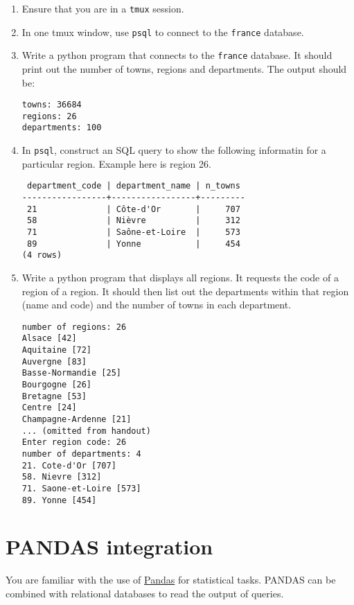 \documentclass{pgnotes}
\begin{document}
\begin{enumerate}

\item Ensure that you are in a \texttt{tmux} session.
  
\item In one tmux window, use \texttt{psql} to connect to the \texttt{france} database.

\item Write a python program that connects to the \texttt{france} database.
  It should print out the number of towns, regions and departments.
  The output should be: 
\begin{verbatim}
towns: 36684
regions: 26
departments: 100
\end{verbatim}

\item In \texttt{psql}, construct an SQL query to show the following informatin for a particular region.
  Example here is region 26.
\begin{verbatim}
 department_code | department_name | n_towns 
-----------------+-----------------+---------
 21              | Côte-d'Or       |     707
 58              | Nièvre          |     312
 71              | Saône-et-Loire  |     573
 89              | Yonne           |     454
(4 rows)
\end{verbatim}

\item Write a python program that displays all regions.
  It requests the code of a region of a region.
  It should then list out the departments within that region (name and code) and the number of towns in each department.
\begin{verbatim}
number of regions: 26
Alsace [42]
Aquitaine [72]
Auvergne [83]
Basse-Normandie [25]
Bourgogne [26]
Bretagne [53]
Centre [24]
Champagne-Ardenne [21]
... (omitted from handout)
Enter region code: 26
number of departments: 4
21. Cote-d'Or [707]
58. Nievre [312]
71. Saone-et-Loire [573]
89. Yonne [454]
\end{verbatim}

\end{enumerate}
  

\section{PANDAS integration}
\label{sec:pandas-integration}

You are familiar with the use of
\href{https://pandas.pydata.org/}{Pandas} for statistical tasks. PANDAS
can be combined with relational databases to read the output of queries.
\end{document}

